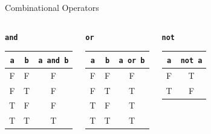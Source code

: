 \documentclass[]{beamer}
\begin{document}
\begin{frame}{Combinational Operators}
  \begin{columns}
    \begin{center}
        \texttt{\textbf{and}}
        \newline\newline
        \begin{tabular}{cc|c}
          \texttt{a} & \texttt{b} & \texttt{a and b} \\
          \hline
          F & F & F\\
          F & T & F\\
          T & F & F\\
          T & T & T\\
        \end{tabular}
    \end{center}

    \begin{center}
        \texttt{\textbf{or}}
        \newline\newline
        \begin{tabular}{cc|c}
          \texttt{a} & \texttt{b} & \texttt{a or b} \\
          \hline
          F & F & F\\
          F & T & T\\
          T & F & T\\
          T & T & T\\
        \end{tabular}
    \end{center}

    \begin{center}
        \texttt{\textbf{not}}
        \newline\newline
        \begin{tabular}{c|c}
          \texttt{a} & \texttt{not a} \\
          \hline
          F & T \\
          T & F \\
        \end{tabular}
    \end{center}
  \end{columns}
\end{frame}
\end{document}
